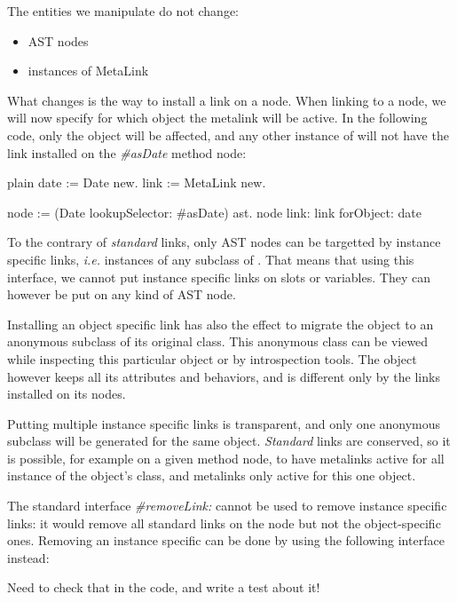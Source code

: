 \documentclass[10pt,twoside,english]{_support/latex/sbabook/sbabook}
\begin{document}
The entities we manipulate do not change:

\begin{itemize}
\item AST nodes
\item instances of MetaLink
\end{itemize}

What changes is the way to install a link on a node. When linking to a node, we will now specify for which object the metalink will be active. In the following code, only the  object will be affected, and any other instance of  will not have the link installed on the \textit{\#asDate} method node:

\begin{displaycode}{plain}
date := Date new.
link := MetaLink new.

node := (Date lookupSelector: #asDate) ast.
node link: link forObject: date
\end{displaycode}

To the contrary of \textit{standard} links, only AST nodes can be targetted by instance specific links, \textit{i.e.} instances of any subclass of . That means that using this interface, we cannot put instance specific links on slots or variables. They can however be put on any kind of AST node.

Installing an object specific link has also the effect to migrate the object to an anonymous subclass of its original class. This anonymous class can be viewed while inspecting this particular object or by introspection tools. The object however keeps all its attributes and behaviors, and is different only by the links installed on its nodes.

Putting multiple instance specific links is transparent, and only one anonymous subclass will be generated for the same object. \textit{Standard} links are conserved, so it is possible, for example on a given method node, to have metalinks active for all instance of the object's class, and metalinks only active for this one object.

The standard interface \textit{\#removeLink:} cannot be used to remove instance specific links: it would remove all standard links on the node but not the object-specific ones. Removing an instance specific can be done by using the following interface instead:

\begin{todo}
Need to check that in the code, and write a test about it!
\end{todo}
\end{document}
